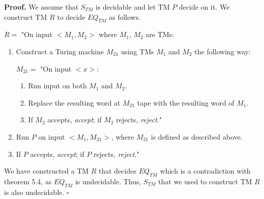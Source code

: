 \documentclass[a4paper, notitlepage]{article}
\begin{document}
\textbf{Proof.} We assume that $S_{TM}$ is decidable and let TM $P$ decide on it. We construct TM $R$ to decide $EQ_{TM}$ as follows.\newline

$R = $ "On input $<M_1, M_2>$ where $M_1$, $M_2$ are TMs:
\begin{enumerate}
\item Construct a Turing machine $M_{21}$ using TMs $M_{1}$ and $M_{2}$ the following way:

$M_{21} = $  "On input $<x>$: 
\begin{enumerate}
\item Run input on both $M_1$ and $M_2$.
\item Replace the resulting word at $M_{21}$ tape with the resulting word of $M_1$.
\item If $M_2$ accepts, \emph{accept}; if $M_2$ rejects, \emph{reject}."
\end{enumerate}

\item Run $P$ on input $<M_1, M_{21}>$, where $M_{21}$ is defined as described above.
\item If $P$ accepts, \emph{accept}; if $P$ rejects, \emph{reject}."
\end{enumerate}

We have constructed a TM $R$ that decides $EQ_{TM}$ which is a contradiction with theorem 5.4, as $EQ_{TM}$ is undecidable. Thus, $S_{TM}$ that we used to construct TM $R$ is also undecidable. $\square$
\end{document}
